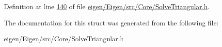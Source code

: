 Definition at line \hyperlink{eigen_2_eigen_2src_2_core_2_solve_triangular_8h_source_l00140}{140} of file \hyperlink{eigen_2_eigen_2src_2_core_2_solve_triangular_8h_source}{eigen/\+Eigen/src/\+Core/\+Solve\+Triangular.\+h}.



The documentation for this struct was generated from the following file\+:\begin{DoxyCompactItemize}
\item 
eigen/\+Eigen/src/\+Core/\+Solve\+Triangular.\+h\end{DoxyCompactItemize}
